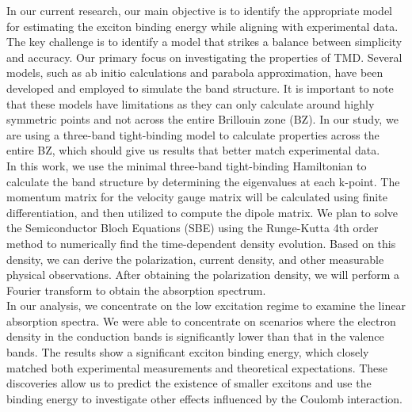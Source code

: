 \documentclass[12pt,english,a4paper]{article}
\begin{document}
	
	\quad In our current research, our main objective is to identify the appropriate model for estimating the exciton binding energy while aligning with experimental data. The key challenge is to identify a model that strikes a balance between simplicity and accuracy. Our primary focus on investigating the properties of TMD. Several models, such as ab initio calculations\cite{kirichenko_influence_2021,ramasubramaniam_large_2012,qiu_optical_2013,cheiwchanchamnangij_quasiparticle_2012,shi_quasiparticle_2013} and parabola approximation\cite{meckbach_ultrafast_2020,berkelbach_theory_2013}, have been developed and employed to simulate the band structure. It is important to note that these models have limitations as they can only calculate around highly symmetric points and not across the entire Brillouin zone (BZ). In our study, we are using a three-band tight-binding model to calculate properties across the entire BZ, which should give us results that better match experimental data.\\\null
	\quad In this work, we use the minimal three-band tight-binding Hamiltonian\cite{liu_three-band_2013} to calculate the band structure by determining the eigenvalues at each k-point. The momentum matrix for the velocity gauge matrix will be calculated using finite differentiation, and then utilized to compute the dipole matrix. We plan to solve the Semiconductor Bloch Equations (SBE) using the Runge-Kutta 4th order method to numerically find the time-dependent density evolution. Based on this density, we can derive the polarization, current density, and other measurable physical observations. After obtaining the polarization density, we will perform a Fourier transform to obtain the absorption spectrum.\\\null	
	\quad In our analysis, we concentrate on the low excitation regime to examine the linear absorption spectra. We were able to concentrate on scenarios where the electron density in the conduction bands is significantly lower than that in the valence bands. The results show a significant exciton binding energy, which closely matched both experimental measurements and theoretical expectations. These discoveries allow us to predict the existence of smaller excitons and use the binding energy to investigate other effects influenced by the Coulomb interaction.\\
\end{document}
